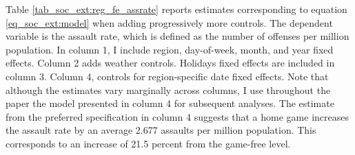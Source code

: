 Table \ref{tab_soc_ext:reg_fe_assrate} reports estimates corresponding to equation \ref{eq_soc_ext:model} when adding progressively more controls. The dependent variable is the assault rate, which is defined as the number of offenses per million population. In column 1, I include region, day-of-week, month, and year fixed effects. Column 2 adds weather controls. Holidays fixed effects are included in column 3. Column 4, controls for region-specific date fixed effects. Note that although the estimates vary marginally across columns, I use throughout the paper the model presented in column 4 for subsequent analyses. The estimate from the preferred specification in column 4 suggests that a home game increases the assault rate by an average 2.677 assaults per million population. This corresponds to an increase of 21.5 percent from the game-free level.






